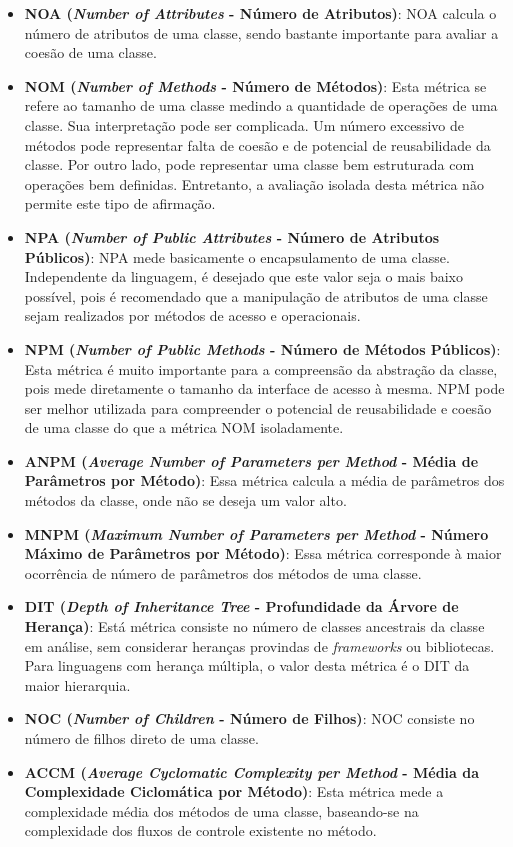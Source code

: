 \begin{itemize}
\item \textbf{NOA (\emph{Number of Attributes} - Número de Atributos)}: NOA calcula o número de atributos de uma classe, sendo bastante importante para avaliar a coesão de uma classe.
\item \textbf{NOM (\emph{Number of Methods} - Número de Métodos)}: Esta métrica se refere ao tamanho de uma classe medindo a quantidade de operações de uma classe. Sua interpretação pode ser complicada. Um número excessivo de métodos pode representar falta de coesão e de potencial de reusabilidade da classe. Por outro lado, pode representar uma classe bem estruturada com operações bem definidas. Entretanto, a avaliação isolada desta métrica não permite este tipo de afirmação.
\item \textbf{NPA (\emph{Number of Public Attributes} - Número de Atributos Públicos)}: NPA mede basicamente o encapsulamento de uma classe. Independente da linguagem, é desejado que este valor seja o mais baixo possível, pois é recomendado que a manipulação de atributos de uma classe sejam realizados por métodos de acesso e operacionais.
\item \textbf{NPM (\emph{Number of Public Methods} - Número de Métodos Públicos)}: Esta métrica é muito importante para a compreensão da abstração da classe, pois mede diretamente o tamanho da interface de acesso à mesma. NPM pode ser melhor utilizada para compreender o potencial de reusabilidade e coesão de uma classe do que a métrica NOM isoladamente.
\item \textbf{ANPM (\emph{Average Number of Parameters per Method} - Média de Parâmetros por Método)}: Essa métrica calcula a média de parâmetros dos métodos da classe, onde não se deseja um valor alto.
\item \textbf{MNPM (\emph{Maximum Number of Parameters per Method} - Número Máximo de Parâmetros por Método)}: Essa métrica corresponde à maior ocorrência de número de parâmetros dos métodos de uma classe.
\item \textbf{DIT (\emph{Depth of Inheritance Tree} - Profundidade da Árvore de Herança)}: Está métrica consiste no número de classes ancestrais da classe em análise, sem considerar heranças provindas de \emph{frameworks} ou bibliotecas. Para linguagens com herança múltipla, o valor desta métrica é o DIT da maior hierarquia.
\item \textbf{NOC (\emph{Number of Children} - Número de Filhos)}: NOC consiste no número de filhos direto de uma classe.
\item \textbf{ACCM (\emph{Average Cyclomatic Complexity per Method} - Média da Complexidade Ciclomática por Método)}: Esta métrica mede a complexidade média dos métodos de uma classe, baseando-se na complexidade dos fluxos de controle existente no método.
\end{itemize}

